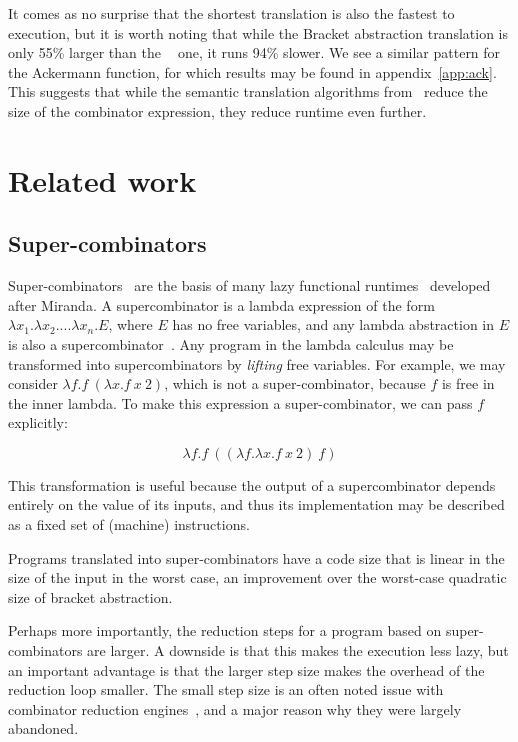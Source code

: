 \documentclass[conference]{IEEEtran}
\DeclareMathOperator{\lazyeta}{lazy_\eta}
\begin{document}
It comes as no surprise that the shortest translation is also the fastest to execution, but it is worth noting that while the Bracket abstraction translation is only 55\% larger than the $\lazyeta$ one, it runs 94\% slower.
We see a similar pattern for the Ackermann function, for which results may be found in appendix~\ref{app:ack}.
This suggests that while the semantic translation algorithms from~\cite{kiselyov_lambda_2018} reduce the size of the combinator expression, they reduce runtime even further.

\section{Related work}
\subsection{Super-combinators}
Super-combinators~\cite{hughes_super-combinators_1982} are the basis of many lazy functional runtimes~\cite{fairbairn_tim_1987,kieburtz_g-machine_1985,burn_spineless_1988,jones_implementing_nodate} developed after Miranda.
A supercombinator is a lambda expression of the form $\lambda x_1. \lambda x_2. ... \lambda x_n. E$, where $E$ has no free variables, and any lambda abstraction in $E$ is also a supercombinator~\cite{spj_impl}.
Any program in the lambda calculus may be transformed into supercombinators by \emph{lifting} free variables.
For example, we may consider $\lambda f.f\ (\lambda x.f\ x\ 2)$, which is not a super-combinator, because $f$ is free in the inner lambda.
To make this expression a super-combinator, we can pass $f$ explicitly:

\[
    \lambda f. f\ ((\lambda f.\lambda x. f\ x\ 2)\ f)
\]

This transformation is useful because the output of a supercombinator depends entirely on the value of its inputs, and thus its implementation may be described as a fixed set of (machine) instructions.

Programs translated into super-combinators have a code size that is linear in the size of the input in the worst case, an improvement over the worst-case quadratic size of bracket abstraction.

Perhaps more importantly, the reduction steps for a program based on super-combinators are larger.
A downside is that this makes the execution less lazy, but an important advantage is that the larger step size makes the overhead of the reduction loop smaller.
The small step size is an often noted issue with combinator reduction engines~\cite{spj_impl}, and a major reason why they were largely abandoned.
\end{document}
